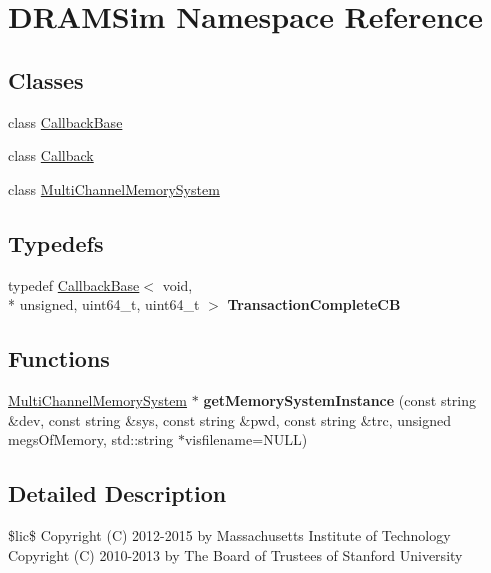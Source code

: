 \hypertarget{namespaceDRAMSim}{\section{D\-R\-A\-M\-Sim Namespace Reference}
\label{namespaceDRAMSim}
}
\subsection*{Classes}
\begin{DoxyCompactItemize}
\item 
class \hyperlink{classDRAMSim_1_1CallbackBase}{Callback\-Base}
\item 
class \hyperlink{classDRAMSim_1_1Callback}{Callback}
\item 
class \hyperlink{classDRAMSim_1_1MultiChannelMemorySystem}{Multi\-Channel\-Memory\-System}
\end{DoxyCompactItemize}
\subsection*{Typedefs}
\begin{DoxyCompactItemize}
\item 
\hypertarget{namespaceDRAMSim_a799e55013fd4f25048bc6eb2f05d5cec}{typedef \hyperlink{classDRAMSim_1_1CallbackBase}{Callback\-Base}$<$ void, \\*
unsigned, uint64\-\_\-t, uint64\-\_\-t $>$ {\bfseries Transaction\-Complete\-C\-B}}\label{namespaceDRAMSim_a799e55013fd4f25048bc6eb2f05d5cec}

\end{DoxyCompactItemize}
\subsection*{Functions}
\begin{DoxyCompactItemize}
\item 
\hypertarget{namespaceDRAMSim_a1b9a1451448ed92d1cece292fba9dff4}{\hyperlink{classDRAMSim_1_1MultiChannelMemorySystem}{Multi\-Channel\-Memory\-System} $\ast$ {\bfseries get\-Memory\-System\-Instance} (const string \&dev, const string \&sys, const string \&pwd, const string \&trc, unsigned megs\-Of\-Memory, std\-::string $\ast$visfilename=N\-U\-L\-L)}\label{namespaceDRAMSim_a1b9a1451448ed92d1cece292fba9dff4}

\end{DoxyCompactItemize}


\subsection{Detailed Description}
\$lic\$ Copyright (C) 2012-\/2015 by Massachusetts Institute of Technology Copyright (C) 2010-\/2013 by The Board of Trustees of Stanford University

